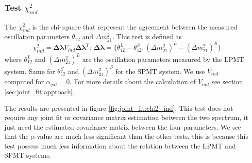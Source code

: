 \documentclass[../main.tex]{subfiles}
\begin{document}
\subsubsection{Test $\chi^2_{ind}$}

The $\chi^2_{ind}$ is the chi-square that represent the agreement between the measured oscillation parameters $\theta_{12}$ and $\Delta m^2_{21}$. This test is defined as
\begin{equation}
  \chi^2_{ind} = \bm{\Delta \lambda} V_{ind} \bm{\Delta \lambda}^T; ~ \bm{\Delta \lambda} = \{\theta_{12}^L - \theta_{12}^S, (\Delta m^2_{21})^L - (\Delta m^2_{21})^S\}
\end{equation}
where $\theta^L_{12}$ and $(\Delta m^2_{21})^L$ are the oscillation parameters measured by the LPMT system. Same for $\theta_{12}^S$ and $(\Delta m^2_{21})^S$ for the SPMT system. We use $V_{ind}$ computed for $\alpha_{qnl} = 0$. For more details about the calculation of $V_{ind}$ see section \ref{sec:joint_fit:approach}.

The results are presented in figure \ref{fig:joint_fit:chi2_ind}. This test does not require any joint fit or covariance matrix estimation between the two spectrum, it just need the estimated covariance matrix between the four parameters. We see that the p-value are much less significant than the other tests, this is because this test possess much less information about the relation between the LPMT and SPMT systems.
\end{document}
